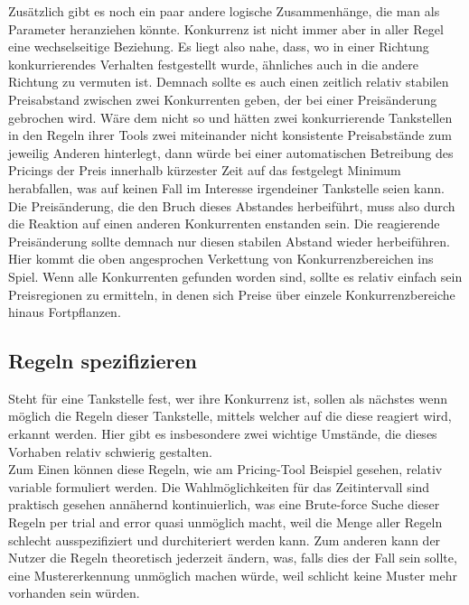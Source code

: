 \documentclass[12pt,a4paper,bibliography=totocnumbered,listof=totocnumbered]{scrartcl}
\begin{document}
Zusätzlich gibt es noch ein paar andere logische Zusammenhänge, die man als Parameter heranziehen könnte. Konkurrenz ist nicht immer aber in aller Regel eine wechselseitige Beziehung. Es liegt also nahe, dass, wo in einer Richtung konkurrierendes Verhalten festgestellt wurde, ähnliches auch in die andere Richtung zu vermuten ist. Demnach sollte es auch einen zeitlich relativ stabilen Preisabstand zwischen zwei Konkurrenten geben, der bei einer Preisänderung gebrochen wird. Wäre dem nicht so und hätten zwei konkurrierende Tankstellen in den Regeln ihrer Tools zwei miteinander nicht konsistente Preisabstände zum jeweilig Anderen hinterlegt, dann würde bei einer automatischen Betreibung des Pricings der Preis innerhalb kürzester Zeit auf das festgelegt Minimum herabfallen, was auf keinen Fall im Interesse irgendeiner Tankstelle seien kann. Die Preisänderung, die den Bruch dieses Abstandes herbeiführt, muss also durch die Reaktion auf einen anderen Konkurrenten enstanden sein. Die reagierende Preisänderung sollte demnach nur diesen stabilen Abstand wieder herbeiführen. Hier kommt die oben angesprochen Verkettung von Konkurrenzbereichen ins Spiel. Wenn alle Konkurrenten gefunden worden sind, sollte es relativ einfach sein Preisregionen zu ermitteln, in denen sich Preise über einzele Konkurrenzbereiche hinaus Fortpflanzen.

\subsection{Regeln spezifizieren}

Steht für eine Tankstelle fest, wer ihre Konkurrenz ist, sollen als nächstes wenn möglich die Regeln dieser Tankstelle, mittels welcher auf die diese reagiert wird, erkannt werden. Hier gibt es insbesondere zwei wichtige Umstände, die dieses Vorhaben relativ schwierig gestalten.\\

Zum Einen können diese Regeln, wie am Pricing-Tool Beispiel gesehen, relativ variable formuliert werden. Die Wahlmöglichkeiten für das Zeitintervall sind praktisch gesehen annähernd kontinuierlich, was eine Brute-force Suche dieser Regeln per trial and error quasi unmöglich macht, weil die Menge aller Regeln schlecht ausspezifiziert und durchiteriert werden kann. Zum anderen kann der Nutzer die Regeln theoretisch jederzeit ändern, was, falls dies der Fall sein sollte, eine Mustererkennung unmöglich machen würde, weil schlicht keine Muster mehr vorhanden sein würden.\\
\end{document}
